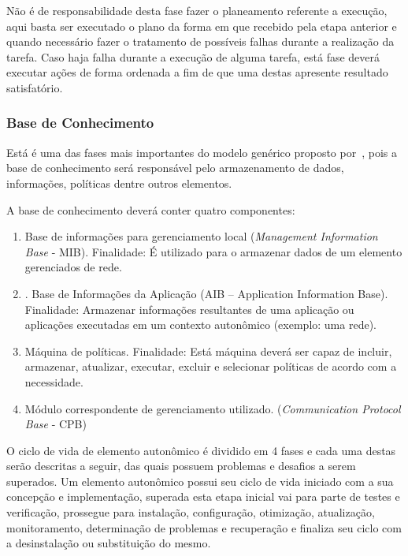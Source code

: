 \documentclass[11pt,twoside]{article}
\begin{document}
Não é de responsabilidade desta fase fazer o planeamento referente a execução, aqui basta ser executado o plano da forma em que recebido pela etapa anterior e quando necessário fazer o tratamento de possíveis falhas durante a realização da tarefa. Caso haja falha durante a execução de alguma tarefa, está fase deverá executar ações de forma ordenada a fim de que uma destas apresente resultado satisfatório.

\subsubsection{Base de Conhecimento}
Está é uma das fases mais importantes do modelo genérico proposto por~\cite{KEPHART}, pois a base de conhecimento será responsável pelo armazenamento de dados, informações, políticas dentre outros elementos.

A base de conhecimento deverá conter quatro componentes: 
\begin{enumerate}

\item	Base de informações para gerenciamento local (\textit{Management Information Base} - MIB).
Finalidade: É utilizado para o armazenar dados de um elemento gerenciados de rede.

\item.	Base de Informações da Aplicação (AIB – Application Information Base).
Finalidade: Armazenar informações resultantes de uma aplicação ou aplicações executadas em um contexto autonômico (exemplo: uma rede).

\item Máquina de políticas. 
Finalidade: Está máquina deverá ser capaz de incluir, armazenar, atualizar, executar, excluir e selecionar políticas de acordo com a necessidade.

\item Módulo correspondente de gerenciamento utilizado. (\textit{Communication Protocol Base} - CPB)
\end{enumerate}

O ciclo de vida de elemento autonômico é dividido em 4 fases e cada uma destas serão descritas a seguir, das quais possuem problemas e desafios a serem superados. Um elemento autonômico possui seu ciclo de vida iniciado com a sua concepção e implementação, superada esta etapa inicial vai para parte de testes e verificação, prossegue para instalação, configuração, otimização, atualização, monitoramento, determinação de problemas e recuperação e finaliza seu ciclo com a desinstalação ou substituição do mesmo.
\end{document}
